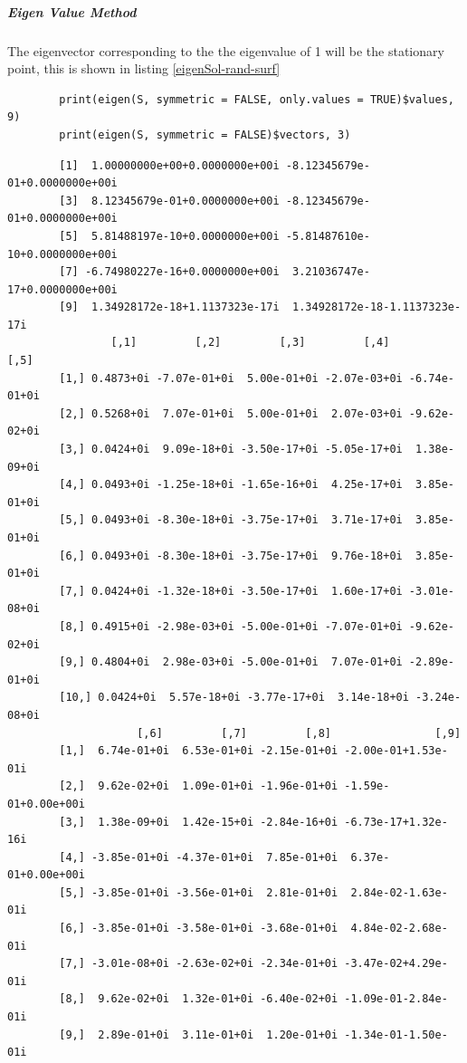 \documentclass[11pt]{report}
\begin{document}
\subparagraph{Eigen Value Method}
\label{eigen-value-method}
The eigenvector corresponding to the the eigenvalue of 1 will be the
stationary point, this is shown in listing \ref{eigenSol-rand-surf}

\begin{listing}[htbp]
    \begin{tcolorbox}
        \begin{verbatim}
        print(eigen(S, symmetric = FALSE, only.values = TRUE)$values, 9)
        print(eigen(S, symmetric = FALSE)$vectors, 3)
        \end{verbatim}
    \tcblower
        \begin{verbatim}
        [1]  1.00000000e+00+0.0000000e+00i -8.12345679e-01+0.0000000e+00i
        [3]  8.12345679e-01+0.0000000e+00i -8.12345679e-01+0.0000000e+00i
        [5]  5.81488197e-10+0.0000000e+00i -5.81487610e-10+0.0000000e+00i
        [7] -6.74980227e-16+0.0000000e+00i  3.21036747e-17+0.0000000e+00i
        [9]  1.34928172e-18+1.1137323e-17i  1.34928172e-18-1.1137323e-17i
                [,1]         [,2]         [,3]         [,4]         [,5]
        [1,] 0.4873+0i -7.07e-01+0i  5.00e-01+0i -2.07e-03+0i -6.74e-01+0i
        [2,] 0.5268+0i  7.07e-01+0i  5.00e-01+0i  2.07e-03+0i -9.62e-02+0i
        [3,] 0.0424+0i  9.09e-18+0i -3.50e-17+0i -5.05e-17+0i  1.38e-09+0i
        [4,] 0.0493+0i -1.25e-18+0i -1.65e-16+0i  4.25e-17+0i  3.85e-01+0i
        [5,] 0.0493+0i -8.30e-18+0i -3.75e-17+0i  3.71e-17+0i  3.85e-01+0i
        [6,] 0.0493+0i -8.30e-18+0i -3.75e-17+0i  9.76e-18+0i  3.85e-01+0i
        [7,] 0.0424+0i -1.32e-18+0i -3.50e-17+0i  1.60e-17+0i -3.01e-08+0i
        [8,] 0.4915+0i -2.98e-03+0i -5.00e-01+0i -7.07e-01+0i -9.62e-02+0i
        [9,] 0.4804+0i  2.98e-03+0i -5.00e-01+0i  7.07e-01+0i -2.89e-01+0i
        [10,] 0.0424+0i  5.57e-18+0i -3.77e-17+0i  3.14e-18+0i -3.24e-08+0i
                    [,6]         [,7]         [,8]                [,9]
        [1,]  6.74e-01+0i  6.53e-01+0i -2.15e-01+0i -2.00e-01+1.53e-01i
        [2,]  9.62e-02+0i  1.09e-01+0i -1.96e-01+0i -1.59e-01+0.00e+00i
        [3,]  1.38e-09+0i  1.42e-15+0i -2.84e-16+0i -6.73e-17+1.32e-16i
        [4,] -3.85e-01+0i -4.37e-01+0i  7.85e-01+0i  6.37e-01+0.00e+00i
        [5,] -3.85e-01+0i -3.56e-01+0i  2.81e-01+0i  2.84e-02-1.63e-01i
        [6,] -3.85e-01+0i -3.58e-01+0i -3.68e-01+0i  4.84e-02-2.68e-01i
        [7,] -3.01e-08+0i -2.63e-02+0i -2.34e-01+0i -3.47e-02+4.29e-01i
        [8,]  9.62e-02+0i  1.32e-01+0i -6.40e-02+0i -1.09e-01-2.84e-01i
        [9,]  2.89e-01+0i  3.11e-01+0i  1.20e-01+0i -1.34e-01-1.50e-01i

\end{verbatim}
\end{tcolorbox}
\end{listing}
\end{document}
